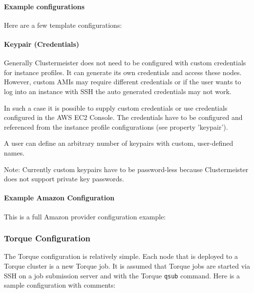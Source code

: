 \documentclass{article}
\begin{document}
\paragraph{Example configurations}

Here are a few template configurations:



\paragraph{Keypair (Credentials)}

Generally Clustermeister does not need to be configured with custom credentials for instance profiles. It can generate its own credentials and access these nodes. However, custom AMIs may require different credentials or if the user wants to log into an instance with SSH the auto generated credentials may not work.

In such a case it is possible to supply custom credentials or use credentials configured in the AWS EC2 Console. The credentials have to be configured and referenced from the instance profile configurations (see property 'keypair').

A user can define an arbitrary number of keypairs with custom, user-defined names.

Note: Currently custom keypairs have to be password-less because Clustermeister does not support private key passwords.



\paragraph{Example Amazon Configuration}

This is a full Amazon provider configuration example:



\subsubsection{Torque Configuration}

The Torque configuration is relatively simple. Each node that is deployed to a Torque cluster is a new Torque job. It is assumed that Torque jobs are started via SSH on a job submission server and with the Torque \texttt{qsub} command. Here is a sample configuration with comments:
\end{document}
